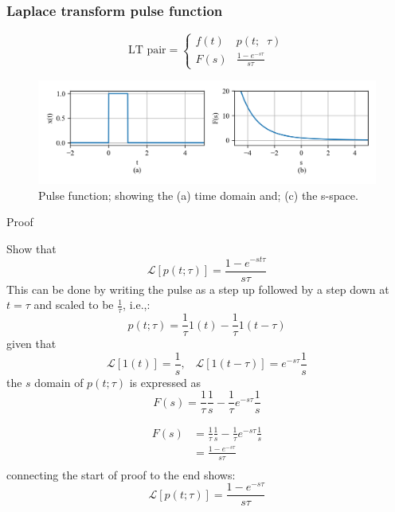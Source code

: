 \documentclass[12pt,letter]{article}
\numberwithin{ex}{section} %
\numberwithin{re}{section} %
\newcommand{\gr}[1]{\textcolor[rgb]{0.00,0.50,0.00}{#1}}
\newcommand{\Laplace}[1]{\ensuremath{\mathcal{L}{\left[#1\right]}}}
\numberwithin{equation}{section}	%
\begin{document}
		\subsubsection{Laplace transform pulse function}

		\begin{equation}
		\text{LT pair} =
			\begin{cases}
			f(t) & p(t; \; \; \tau) \\
			F(s) & \frac{1-e^{-s \tau}}{s \tau}
			\end{cases}
		\end{equation}

		\begin{figure}[H]
			\centering
			\includegraphics[width=6.5in]{../figures/T_and_S_pulse_function}
			\caption{Pulse function; showing the (a) time domain and; (c) the s-space.}
			\label{fig:Laplace_pulse_transform}
		\end{figure}


\begin{mdframed}[middlelinewidth=0.5mm]
\begin{center}
\gr{Proof}
\end{center}
Show that
\begin{equation}
\Laplace{p(t;\tau)} = \frac{1-e^{-st\tau}}{s \tau}
\end{equation}
This can be done by writing the pulse as a step up followed by a step down at $t=\tau$ and scaled to be $\frac{1}{\tau}$, i.e.,:
\begin{equation}
p(t;\tau) = \frac{1}{\tau}1(t) - \frac{1}{\tau} 1 (t-\tau)
\end{equation}
given that
\begin{equation}
\Laplace{1(t)} =  \frac{1}{s}, \; \; \; \Laplace{1 (t-\tau)} = e^{-s \tau} \frac{1}{s}
\end{equation}
the $s$ domain of $p(t;\tau)$ is expressed as
\begin{equation}
F(s) =   \frac{1}{\tau}  \frac{1}{s}  - \frac{1}{\tau} e^{-s \tau} \frac{1}{s}
\end{equation}

\begin{align}
	 F(s) &=   \frac{1}{\tau}  \frac{1}{s}  - \frac{1}{\tau} e^{-s \tau} \frac{1}{s} \\ \nonumber
	&=  \frac{1-e^{-s \tau}}{s \tau} \\ \nonumber
\end{align}
connecting the start of proof to the end shows:
\begin{equation}
\Laplace{p(t;\tau)} = \frac{1-e^{-s \tau}}{s \tau}
\end{equation}

\end{mdframed}
\end{document}
